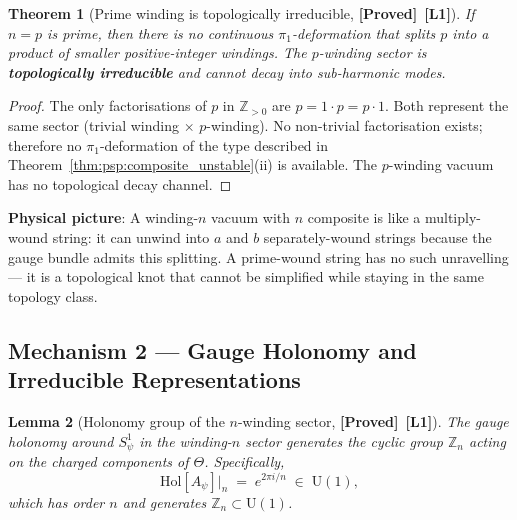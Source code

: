 \documentclass[12pt,a4paper]{article}
\newtheorem{theorem}{Theorem}[section]
\newtheorem{lemma}[theorem]{Lemma}
\theoremstyle{definition}
\theoremstyle{remark}
\newcommand{\ZZ}{\mathbb{Z}}
\newcommand{\PROVED}{\textbf{[Proved]}}
\newcommand{\Lone}{\textbf{[L1]}}
\begin{document}
\begin{theorem}[Prime winding is topologically irreducible, \PROVED\ \Lone]
\label{thm:psp:prime_stable}
If $n = p$ is prime, then there is no continuous $\pi_1$-deformation that splits
$p$ into a product of smaller positive-integer windings.  The $p$-winding sector
is \textbf{topologically irreducible} and cannot decay into sub-harmonic modes.
\end{theorem}

\begin{proof}
The only factorisations of $p$ in $\ZZ_{>0}$ are $p = 1 \cdot p = p \cdot 1$.
Both represent the same sector (trivial winding $\times$ $p$-winding).
No non-trivial factorisation exists; therefore no $\pi_1$-deformation of the type
described in Theorem~\ref{thm:psp:composite_unstable}(ii) is available.
The $p$-winding vacuum has no topological decay channel.
\end{proof}

\begin{infobox}
\textbf{Physical picture}: A winding-$n$ vacuum with $n$ composite is like a
multiply-wound string: it can unwind into $a$ and $b$ separately-wound strings
because the gauge bundle admits this splitting.  A prime-wound string has no
such unravelling — it is a topological knot that cannot be simplified while
staying in the same topology class.
\end{infobox}

\subsection{Mechanism 2 — Gauge Holonomy and Irreducible Representations}
\label{sec:psp:gauge}

\begin{lemma}[Holonomy group of the $n$-winding sector, \PROVED\ \Lone]
\label{lem:psp:holonomy}
The gauge holonomy around $S^1_\psi$ in the winding-$n$ sector generates the
cyclic group $\ZZ_n$ acting on the charged components of $\Theta$.  Specifically,
\begin{equation}
  \mathrm{Hol}[A_\psi]\big|_n
  \;=\; e^{2\pi i / n}
  \;\in\; \mathrm{U}(1),
  \label{eq:psp:hol}
\end{equation}
which has order $n$ and generates $\ZZ_n \subset \mathrm{U}(1)$.
\end{lemma}
\end{document}
